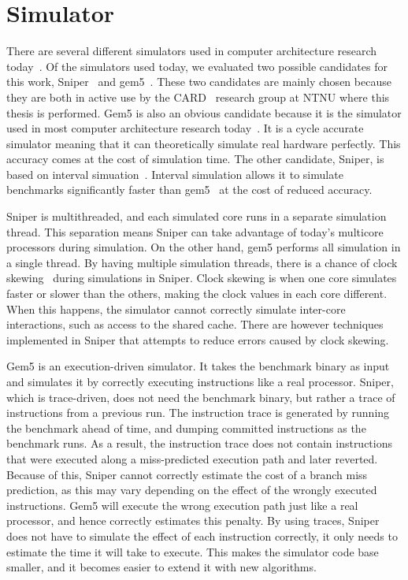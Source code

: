 \section{Simulator}
\label{sec:framework:simulator}

There are several different simulators used in computer architecture research today~\cite{Carlson2011a, Binkert2011, Miller2010, Pellauer2011}.
Of the simulators used today, we evaluated two possible candidates for this work, Sniper~\cite{Carlson2011a} and gem5~\cite{Binkert2011}.
These two candidates are mainly chosen because they are both in active use by the CARD~\cite{CARD2015} research group at NTNU where this thesis is performed.
Gem5 is also an obvious candidate because it is the simulator used in most computer architecture research today~\cite{Chen-Han2014}.
It is a cycle accurate simulator meaning that it can theoretically simulate real hardware perfectly.
This accuracy comes at the cost of simulation time.
The other candidate, Sniper, is based on interval simuation~\cite{Genbrugge2010}. 
Interval simulation allows it to simulate benchmarks significantly faster than gem5~\cite{Carlson2011a, Olsen2014} at the cost of reduced accuracy.

Sniper is multithreaded, and each simulated core runs in a separate simulation thread.
This separation means Sniper can take advantage of today's multicore processors during simulation.
On the other hand, gem5 performs all simulation in a single thread.
By having multiple simulation threads, there is a chance of clock skewing~\cite{Carlson2011a} during simulations in Sniper.
Clock skewing is when one core simulates faster or slower than the others, making the clock values in each core different.
When this happens, the simulator cannot correctly simulate inter-core interactions, such as access to the shared cache.
There are however techniques implemented in Sniper that attempts to reduce errors caused by clock skewing.

Gem5 is an execution-driven simulator. 
It takes the benchmark binary as input and simulates it by correctly executing instructions like a real processor.
Sniper, which is trace-driven, does not need the benchmark binary, but rather a trace of instructions from a previous run.
The instruction trace is generated by running the benchmark ahead of time, and dumping committed instructions as the benchmark runs.
As a result, the instruction trace does not contain instructions that were executed along a miss-predicted execution path and later reverted.
Because of this, Sniper cannot correctly estimate the cost of a branch miss prediction, as this may vary depending on the effect of the wrongly executed instructions.
Gem5 will execute the wrong execution path just like a real processor, and hence correctly estimates this penalty.
By using traces, Sniper does not have to simulate the effect of each instruction correctly, it only needs to estimate the time it will take to execute.
This makes the simulator code base smaller, and it becomes easier to extend it with new algorithms.

